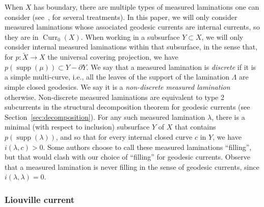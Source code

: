 \documentclass[12pt,article]{amsart}
\numberwithin{equation}{section}
\numberwithin{figure}{section}
\theoremstyle{definition}
\theoremstyle{plain}
\DeclareMathOperator{\Curr}{Curr}
\newcommand*{\wt}[1]{\widetilde{#1}}
\DeclareMathOperator{\supp}{supp}
\begin{document}
When $X$ has boundary, there are multiple types of measured laminations one can consider (see~\cite[1.8]{HP92:TrainTracks}, \cite[Chapter~11]{Kap00:Kapovich2000HyperbolicMA} for several treatments). In this paper, we will only consider measured laminations whose associated geodesic currents are internal currents, so they are in $\Curr_0(X)$.
When working in a subsurface $Y \subset X$, we will only consider internal measured laminations within that subsurface, in the sense that, for $p \colon \wt{X} \to X$ the universal covering projection, we have $p(\supp(\mu)) \subset Y-\partial Y$.
We say that a measured lamination is \emph{discrete} if it is a simple multi-curve, i.e., all the leaves of the support of the lamination $\Lambda$ are simple closed geodesics. We say it is a \emph{non-discrete measured lamination} otherwise.
Non-discrete measured laminations are equivalent to type 2 subcurrents in the structural decomposition theorem for geodesic currents (see Section~\ref{sec:decomposition}). For any such measured lamination $\lambda$, there is a minimal (with respect to inclusion) subsurface $Y$ of $X$ that contains $p(\supp(\lambda))$, and so that for every internal closed curve $c$ in $Y$, we have $i(\lambda,c)>0$. Some authors choose to call these measured laminations ``filling'', but that would clash with our choice of ``filling'' for geodesic currents. Observe that a measured lamination is never filling in the sense of geodesic currents, since $i(\lambda,\lambda)=0$.
 

\subsubsection{Liouville current}
\end{document}
